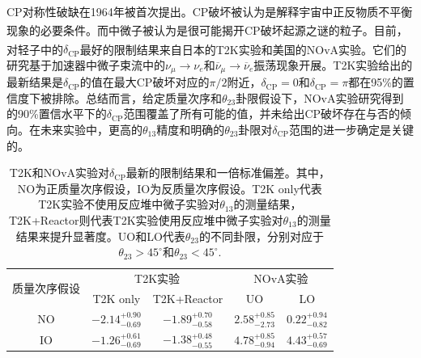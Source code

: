 \documentclass[a4paper,zihao=-4]{article}
\newcommand{\citess}[1]{\textsuperscript{\cite{#1}}}
\begin{document}
CP对称性破缺在1964年被首次提出\citess{Christenson:1964fg}。CP破坏被认为是解释宇宙中正反物质不平衡现象的必要条件\citess{Sakharov:1967dj}。而中微子被认为是很可能揭开CP破坏起源之谜的粒子。目前，对轻子中的$\delta_{\text{CP}}$最好的限制结果来自日本的T2K实验\citess{T2K:2021xwb}和美国的NOvA实验\citess{NOvA:2021nfi}。它们的研究基于加速器中微子束流中的$\nu_\mu\to\nu_e$和$\overline{\nu}_\mu\to\overline{\nu}_e$振荡现象开展。T2K实验给出的最新结果是$\delta_{\text{CP}}$的值在最大CP破坏对应的$\pi/2$附近，$\delta_{\text{CP}}=0$和$\delta_{\text{CP}}=\pi$都在95\%的置信度下被排除。总结而言，给定质量次序和$\theta_{23}$卦限假设下，NOvA实验研究得到的90\%置信水平下的$\delta_{\text{CP}}$范围覆盖了所有可能的值，并未给出CP破坏存在与否的倾向。在未来实验中，更高的$\theta_{13}$精度和明确的$\theta_{23}$卦限对$\delta_{\text{CP}}$范围的进一步确定是关键的。
\begin{table}[htb!]
	\centering
	\setlength{\tabcolsep}{10pt}
	\caption{T2K和NOvA实验对$\delta_{\text{CP}}$最新的限制结果和一倍标准偏差。其中，NO为正质量次序假设，IO为反质量次序假设。T2K only代表T2K实验不使用反应堆中微子实验对$\theta_{13}$的测量结果，T2K+Reactor则代表T2K实验使用反应堆中微子实验对$\theta_{13}$的测量结果来提升显著度。UO和LO代表$\theta_{23}$的不同卦限，分别对应于$\theta_{23}>45^\circ$和$\theta_{23}<45^\circ$.}
	\begin{tabular}{ccccc}
		\toprule
		\multirow{2}{*}{质量次序假设} & \multicolumn{2}{c}{T2K实验} & \multicolumn{2}{c}{NOvA实验} \\ 
		\cmidrule{2-3} \cmidrule{4-5}
	& \multicolumn{1}{c}{T2K only} & \multicolumn{1}{c}{T2K+Reactor} & \multicolumn{1}{c}{UO} & \multicolumn{1}{c}{LO} \\
		\midrule          
		NO & $-2.14^{+0.90}_{-0.69}$ & $-1.89^{+0.70}_{-0.58}$ & $2.58^{+0.85}_{-2.73}$ & $0.22^{+0.94}_{-0.82}$ \\
		IO & $-1.26^{+0.61}_{-0.69}$ & $-1.38^{+0.48}_{-0.55}$ & $4.78^{+0.85}_{-0.94}$ & $4.43^{+0.57}_{-0.69}$ \\
		\bottomrule
	\end{tabular}%
	\label{tab:CP-measurements}%
\end{table}%
\end{document}
